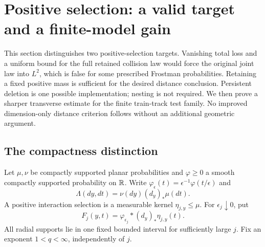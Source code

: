\section{Positive selection: a valid target and a finite-model gain}
\label{selection:section}

This section distinguishes two positive-selection targets. Vanishing total
loss and a uniform bound for the full retained collision law would force the
original joint law into \(L^2\), which is false for some prescribed Frostman
probabilities. Retaining a fixed positive mass is sufficient for the desired
distance conclusion. Persistent deletion is one possible implementation;
nesting is not required. We then prove a sharper transverse estimate for
the finite train-track test family. No improved dimension-only distance
criterion follows without an additional geometric argument.

\subsection{The compactness distinction}
\label{selection:compactness-section}
Let \(\mu,\nu\) be compactly supported planar probabilities and
\(\varphi\ge0\) a smooth compactly supported probability on \(\mathbb R\).
Write \(\varphi_\epsilon(t)=\epsilon^{-1}\varphi(t/\epsilon)\) and
\[
 \Lambda(dy,dt)=\nu(dy)(d_y)_*\mu(dt).
\]
A positive interaction selection is a measurable kernel
\(\eta_{j,y}\le\mu\). For \(\epsilon_j\downarrow0\), put
\[
 F_j(y,t)=\varphi_{\epsilon_j}*(d_y)_*\eta_{j,y}(t).
\]
All radial supports lie in one fixed bounded interval for sufficiently
large \(j\). Fix an exponent \(1<q<\infty\), independently of \(j\).

